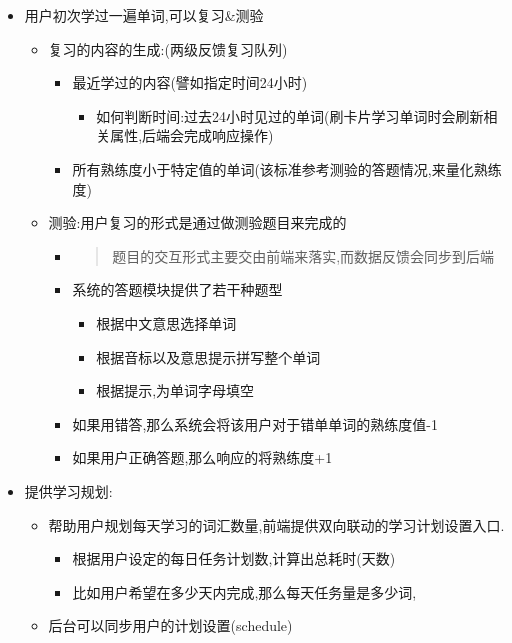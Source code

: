 \documentclass[
]{article}
\begin{document}
\begin{itemize}
\item
  用户初次学过一遍单词,可以复习\&测验

  \begin{itemize}
  \item
    复习的内容的生成:(两级反馈复习队列)

    \begin{itemize}
    \item
      最近学过的内容(譬如指定时间24小时)

      \begin{itemize}
      \item
        如何判断时间:过去24小时见过的单词(刷卡片学习单词时会刷新相关属性,后端会完成响应操作)
      \end{itemize}
    \item
      所有熟练度小于特定值的单词(该标准参考测验的答题情况,来量化熟练度)
    \end{itemize}
  \item
    测验:用户复习的形式是通过做测验题目来完成的

    \begin{itemize}
    \item
      \begin{quote}
      题目的交互形式主要交由前端来落实,而数据反馈会同步到后端
      \end{quote}
    \item
      系统的答题模块提供了若干种题型

      \begin{itemize}
      \item
        根据中文意思选择单词
      \item
        根据音标以及意思提示拼写整个单词
      \item
        根据提示,为单词字母填空
      \end{itemize}
    \item
      如果用错答,那么系统会将该用户对于错单单词的熟练度值-1
    \item
      如果用户正确答题,那么响应的将熟练度+1
    \end{itemize}
  \end{itemize}
\item
  提供学习规划:

  \begin{itemize}
  \item
    帮助用户规划每天学习的词汇数量,前端提供双向联动的学习计划设置入口.

    \begin{itemize}
    \item
      根据用户设定的每日任务计划数,计算出总耗时(天数)
    \item
      比如用户希望在多少天内完成,那么每天任务量是多少词,
    \end{itemize}
  \item
    后台可以同步用户的计划设置(schedule)
  \end{itemize}
\end{itemize}
\end{document}
